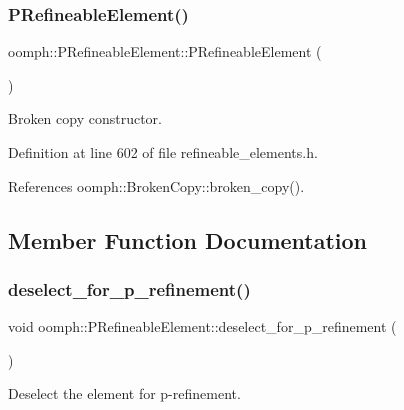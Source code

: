\subsubsection{\texorpdfstring{P\+Refineable\+Element()}{PRefineableElement()}\hspace{0.1cm}{\footnotesize\ttfamily [2/2]}}
{\footnotesize\ttfamily oomph\+::\+P\+Refineable\+Element\+::\+P\+Refineable\+Element (\begin{DoxyParamCaption}\item[{const \hyperlink{classoomph_1_1PRefineableElement}{P\+Refineable\+Element} \&}]{ }\end{DoxyParamCaption})\hspace{0.3cm}{\ttfamily [inline]}}



Broken copy constructor. 



Definition at line 602 of file refineable\+\_\+elements.\+h.



References oomph\+::\+Broken\+Copy\+::broken\+\_\+copy().



\subsection{Member Function Documentation}
\mbox{\label{classoomph_1_1PRefineableElement_ae09fd11dea8f804c352a447a6bbdfb9a}} 
\subsubsection{\texorpdfstring{deselect\+\_\+for\+\_\+p\+\_\+refinement()}{deselect\_for\_p\_refinement()}}
{\footnotesize\ttfamily void oomph\+::\+P\+Refineable\+Element\+::deselect\+\_\+for\+\_\+p\+\_\+refinement (\begin{DoxyParamCaption}{ }\end{DoxyParamCaption})\hspace{0.3cm}{\ttfamily [inline]}}



Deselect the element for p-\/refinement. 



